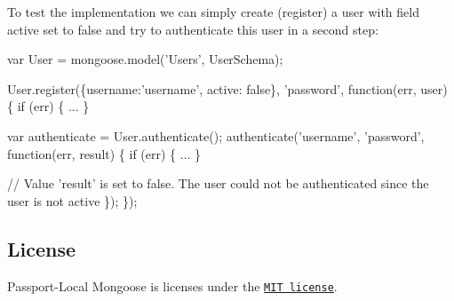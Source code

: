 To test the implementation we can simply create (register) a user with field {\ttfamily active} set to {\ttfamily false} and try to authenticate this user in a second step\+:


\begin{DoxyCode}
var User = mongoose.model('Users', UserSchema);

User.register(\{username:'username', active: false\}, 'password', function(err, user) \{
  if (err) \{ ... \}

  var authenticate = User.authenticate();
  authenticate('username', 'password', function(err, result) \{
    if (err) \{ ... \}

    // Value 'result' is set to false. The user could not be authenticated since the user is not active
  \});
\});
\end{DoxyCode}


\subsection*{License}

Passport-\/\+Local Mongoose is licenses under the \href{http://opensource.org/licenses/MIT}{\tt M\+IT license}. 